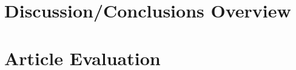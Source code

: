 \documentclass[
10pt, %
letterpaper, %
twocolumn, %
landscape %
]{article}
\begin{document}

\section{Discussion/Conclusions Overview}




\section*{Article Evaluation}




\renewcommand{\refname}{Reference} %


\end{document}
